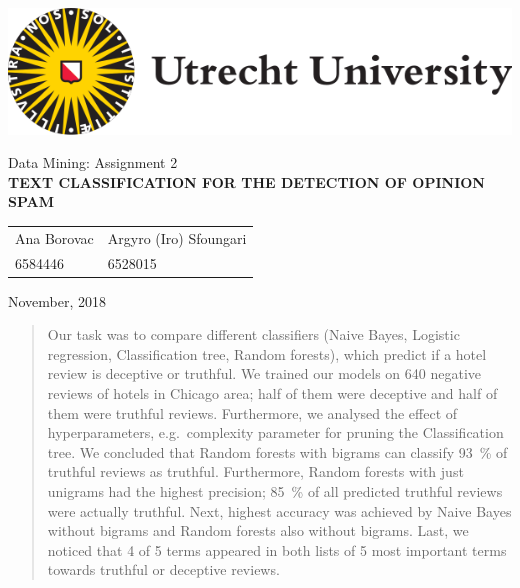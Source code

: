 \documentclass[a4paper,11pt]{article}
\begin{document}
\thispagestyle{empty}

\includegraphics[scale=0.35]{UUlogo.png}

\vspace{50mm}

\begin{center}
\begin{large}
Data Mining: Assignment 2 \\[3mm]
\textbf{
\uppercase{Text Classification for the Detection of Opinion Spam}} \\[25mm]
\end{large}

\begin{tabularx}{\textwidth}{YY}
Ana Borovac & Argyro (Iro) Sfoungari \\
6584446 & 6528015
\end{tabularx}
\end{center}

\vfill

November, 2018

\newpage

\tableofcontents

\vspace{2.5cm}

\begin{abstract}
Our task was to compare different classifiers (Naive Bayes, Logistic regression, Classification tree, Random forests), which predict if a hotel review is deceptive or truthful. We trained our models on 640 negative reviews of hotels in Chicago area; half of them were deceptive and half of them were truthful reviews. Furthermore, we analysed the effect of hyperparameters, e.g.\ complexity parameter for pruning the Classification tree. We concluded that Random forests with bigrams can classify 93~\% of truthful reviews as truthful. Furthermore, Random forests with just unigrams had the highest precision; 85~\% of all predicted truthful reviews were actually truthful. Next, highest accuracy was achieved by Naive Bayes without bigrams and Random forests also without bigrams. Last, we noticed that 4 of 5 terms appeared in both lists of 5 most important terms towards truthful or deceptive reviews.
\end{abstract}
\end{document}

